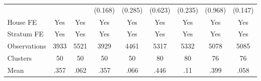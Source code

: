 {\begin{tabular}{l*{8}{c}}
                &                  &                  &  (0.168)         &  (0.285)         &  (0.623)         &  (0.235)         &  (0.968)         &  (0.147)         \\
House FE        &      Yes         &      Yes         &      Yes         &      Yes         &      Yes         &      Yes         &      Yes         &      Yes         \\
Stratum FE      &      Yes         &      Yes         &      Yes         &      Yes         &      Yes         &      Yes         &      Yes         &      Yes         \\
\midrule
Observations    &     3933         &     5521         &     3929         &     4461         &     5317         &     5332         &     5078         &     5085         \\
Clusters        &       50         &       50         &       50         &       50         &       80         &       80         &       76         &       76         \\
Mean            &     .357         &     .062         &     .357         &     .066         &     .446         &      .11         &     .399         &     .058         \\
\bottomrule
\end{tabular}
}
